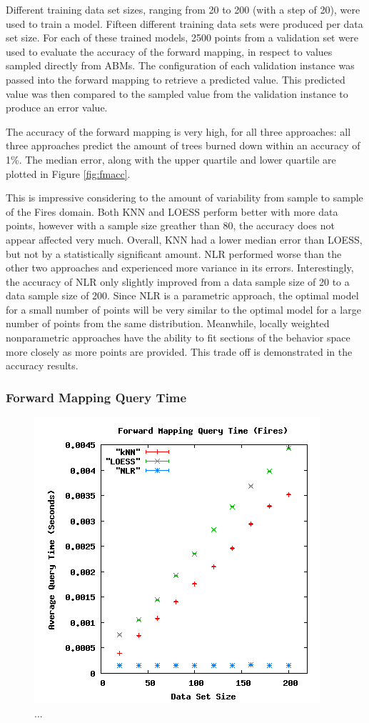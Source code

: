 Different training data set sizes, ranging from 20 to 200 (with a step of 20), were used to train a model.
Fifteen different training data sets were produced per data set size.
For each of these trained models, 2500 points from a validation set were used to evaluate the accuracy of the forward mapping, in respect to values sampled directly from ABMs.
The configuration of each validation instance was passed into the forward mapping to retrieve a predicted value.
This predicted value was then compared to the sampled value from the validation instance to produce an error value.

The accuracy of the forward mapping is very high, for all three approaches: all three approaches predict the amount of trees burned down within an accuracy of 1\%.
The median error, along with the upper quartile and lower quartile are plotted in Figure \ref{fig:fmacc}.

This is impressive considering to the amount of variability from sample to sample of the Fires domain.
Both KNN and LOESS perform better with more data points, however with a sample size greather than 80, the accuracy does not appear affected very much.
Overall, KNN had a lower median error than LOESS, but not by a statistically significant amount.
NLR performed worse than the other two approaches and experienced more variance in its errors.
Interestingly, the accuracy of NLR only slightly improved from a data sample size of 20 to a data sample size of 200.
Since NLR is a parametric approach, the optimal model for a small number of points will be very similar to the optimal model for a large number of points from the same distribution.
Meanwhile, locally weighted nonparametric approaches have the ability to fit sections of the behavior space more closely as more points are provided.
This trade off is demonstrated in the accuracy results.


\subsubsection{Forward Mapping Query Time}
\begin{figure}[ht]
\centering
\includegraphics[scale=.5]{images/results_fires/fmquery.png}
\caption{...}
\label{fig:fmquery}
\end{figure}

